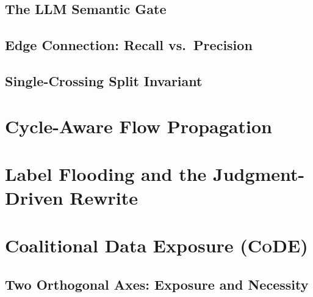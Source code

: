 \documentclass[sigconf,anonymous,review]{acmart}
\newcommand{\code}{\textsc{CoDE}\xspace}     %
\begin{document}
\subsection{The LLM Semantic Gate}\label{sec:sfg:gate}
\subsection{Edge Connection: Recall vs.\ Precision}\label{sec:sfg:edges}
\subsection{Single-Crossing Split Invariant}\label{sec:sfg:split}

\section{Cycle-Aware Flow Propagation}\label{sec:cycle}

\section{Label Flooding and the Judgment-Driven Rewrite}\label{sec:flood}

\section{Coalitional Data Exposure (\code)}\label{sec:code}
\subsection{Two Orthogonal Axes: Exposure and Necessity}\label{sec:code:axes}
\end{document}
